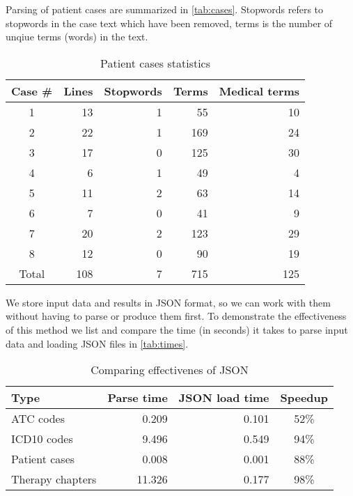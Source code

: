 Parsing of patient cases are summarized in \autoref{tab:cases}. Stopwords
refers to stopwords in the case text which have been removed, terms is the
number of unqiue terms (words) in the text.
\begin{table}[htbp] \footnotesize \center
\caption{Patient cases statistics\label{tab:cases}}
\begin{tabular}{c r r r r}
    \toprule
	Case \# & Lines & Stopwords & Terms & Medical terms \\
    \midrule
	1 & 13 & 1 & 55 & 10 \\
	2 & 22 & 1 & 169 & 24 \\
	3 & 17 & 0 & 125 & 30 \\
	4 & 6 & 1 & 49 & 4 \\
	5 & 11 & 2 & 63 & 14 \\
	6 & 7 & 0 & 41 & 9 \\
	7 & 20 & 2 & 123 & 29 \\
	8 & 12 & 0 & 90 & 19 \\
    \midrule
	Total & 108 & 7 & 715 & 125 \\
	\bottomrule
\end{tabular}
\end{table}

We store input data and results in JSON format, so we can work with them
without having to parse or produce them first. To demonstrate the
effectiveness of this method we list and compare the time (in seconds) it
takes to parse input data and loading JSON files in \autoref{tab:times}.
\begin{table}[htbp] \footnotesize \center
\caption{Comparing effectivenes of JSON\label{tab:times}}
\begin{tabular}{l r r c}
    \toprule
    Type & Parse time & JSON load time & Speedup \\
    \midrule
	ATC codes & 0.209 & 0.101 & 52\% \\
	ICD10 codes & 9.496 & 0.549 & 94\% \\
	Patient cases & 0.008 & 0.001 & 88\% \\
	Therapy chapters & 11.326 & 0.177 & 98\% \\
	\bottomrule
\end{tabular}
\end{table}


